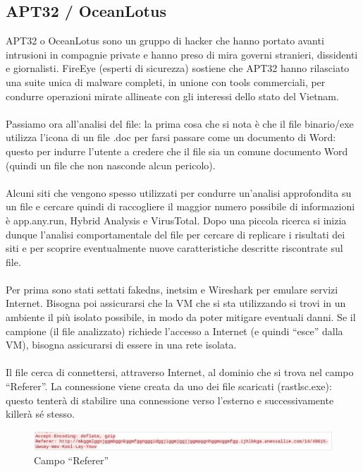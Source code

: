 \documentclass{article}
\begin{document}
\subsection{APT32 / OceanLotus}
\noindent
APT32 o OceanLotus sono un gruppo di hacker che hanno portato avanti intrusioni in compagnie private 
e hanno preso di mira governi stranieri, dissidenti e giornalisti. FireEye (esperti di sicurezza) 
sostiene che APT32 hanno rilasciato una suite unica di malware completi, in unione con tools commerciali, 
per condurre operazioni mirate allineate con gli interessi dello stato del Vietnam. \\\\
Passiamo ora all’analisi del file: la prima cosa che si nota è che il file binario/exe utilizza 
l’icona di un file .doc per farsi passare come un documento di Word: questo per indurre l’utente a 
credere che il file sia un comune documento Word (quindi un file che non nasconde alcun pericolo). \\\\
Alcuni siti che vengono spesso utilizzati per condurre un’analisi approfondita su un file e cercare 
quindi di raccogliere il maggior numero possibile di informazioni è app.any.run, Hybrid Analysis e 
VirusTotal. Dopo una piccola ricerca si inizia dunque l’analisi comportamentale del file per cercare 
di replicare i risultati dei siti e per scoprire eventualmente nuove caratteristiche descritte 
riscontrate sul file.\\\\
Per prima sono stati settati fakedns, inetsim e Wireshark per emulare servizi Internet. Bisogna 
poi assicurarsi che la VM che si sta utilizzando si trovi in un ambiente il più isolato possibile, 
in modo da poter mitigare eventuali danni. Se il campione (il file analizzato) richiede l’accesso 
a Internet (e quindi “esce” dalla VM), bisogna assicurarsi di essere in una rete isolata.\\\\
Il file cerca di connettersi, attraverso Internet, al dominio che si trova nel campo “Referer”. 
La connessione viene creata da uno dei file scaricati (rastlsc.exe): questo tenterà di stabilire 
una connessione verso l’esterno e successivamente killerà sé stesso. 
\begin{figure}[H]
    \center
    \includegraphics[scale=0.3]{images/OceanLotus1.png}
    \caption{Campo “Referer”}\label{fig:1}
\end{figure}
\end{document}
